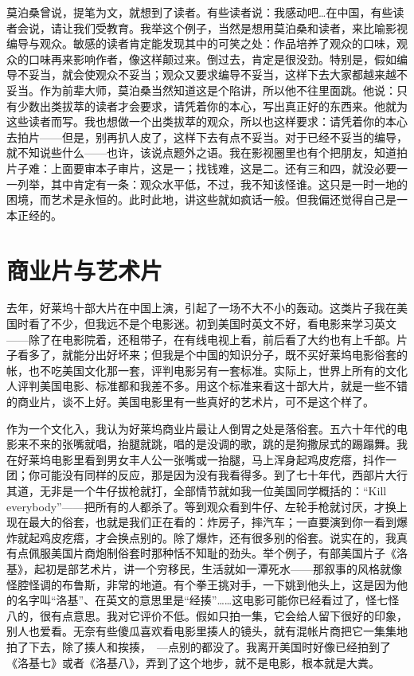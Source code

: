 莫泊桑曾说，提笔为文，就想到了读者。有些读者说：我感动吧…在中国，有些读者会说，请让我们受教育。我举这个例子，当然是想用莫泊桑和读者，来比喻影视编导与观众。敏感的读者肯定能发现其中的可笑之处：作品培养了观众的口味，观众的口味再来影响作者，像这样颠过来。倒过去，肯定是很没劲。特别是，假如编导不妥当，就会使观众不妥当；观众又要求编导不妥当，这样下去大家都越来越不妥当。作为前辈大师，莫泊桑当然知道这是个陷讲，所以他不往里面跳。他说：只有少数出类拔萃的读者才会要求，请凭着你的本心，写出真正好的东西来。他就为这些读者而写。我也想做一个出类拔萃的观众，所以也这样要求：请凭着你的本心去拍片——但是，别再扒人皮了，这样下去有点不妥当。对于已经不妥当的编导，就不知说些什么——也许，该说点题外之语。我在影视圈里也有个把朋友，知道拍片子难：上面要审本子审片，这是一；找钱难，这是二。还有三和四，就没必要一一列举，其中肯定有一条：观众水平低，不过，我不知该怪谁。这只是一时一地的困境，而艺术是永恒的。此时此地，讲这些就如疯话一般。但我偏还觉得自己是一本正经的。
 
\chapter{商业片与艺术片}

去年，好莱坞十部大片在中国上演，引起了一场不大不小的轰动。这类片子我在美国时看了不少，但我远不是个电影迷。初到美国时英文不好，看电影来学习英文——除了在电影院着，还租带子，在有线电视上看，前后看了大约也有上千部。片子看多了，就能分出好坏来；但我是个中国的知识分子，既不买好莱坞电影俗套的帐，也不吃美国文化那一套，评判电影另有一套标准。实际上，世界上所有的文化人评判美国电影、标准都和我差不多。用这个标准来看这十部大片，就是一些不错的商业片，谈不上好。美国电影里有一些真好的艺术片，可不是这个样了。 

作为一个文化入，我认为好莱坞商业片最让人倒胃之处是落俗套。五六十年代的电影来不来的张嘴就唱，抬腿就跳，唱的是没调的歌，跳的是狗撒尿式的踢蹋舞。我在好莱坞电影里看到男女丰人公一张嘴或一抬腿，马上浑身起鸡皮疙瘩，抖作一团；你可能没有同样的反应，那是因为没有我看得多。到了七十年代，西部片大行其道，无非是一个牛仔拔枪就打，全部情节就如我一位美国同学概括的：“Kill　everybody”——把所有的人都杀了。等到观众看到牛仔、左轮手枪就讨厌，才换上现在最大的俗套，也就是我们正在看的：炸房子，摔汽车；一直要演到你一看到爆炸就起鸡皮疙瘩，才会换点别的。除了爆炸，还有很多别的俗套。说实在的，我真有点佩服美国片商炮制俗套时那种恬不知耻的劲头。举个例子，有部美国片子《洛基》，起初是部艺术片，讲一个穷移民，生活就如一潭死水——那叙事的风格就像怪腔怪调的布鲁斯，非常的地道。有个拳王挑对手，一下姚到他头上，这是因为他的名字叫“洛基”、在英文的意思里是“经揍”……这电影可能你已经看过了，怪七怪八的，很有点意思。我对它评价不低。假如只拍一集，它会给人留下很好的印象，别人也爱看。无奈有些傻瓜喜欢看电影里揍人的镜头，就有混帐片商把它一集集地拍了下去，除了揍人和挨揍，　—点别的都没了。我离开美国时好像已经拍到了《洛基七》或者《洛基八》，弄到了这个地步，就不是电影，根本就是大粪。 

